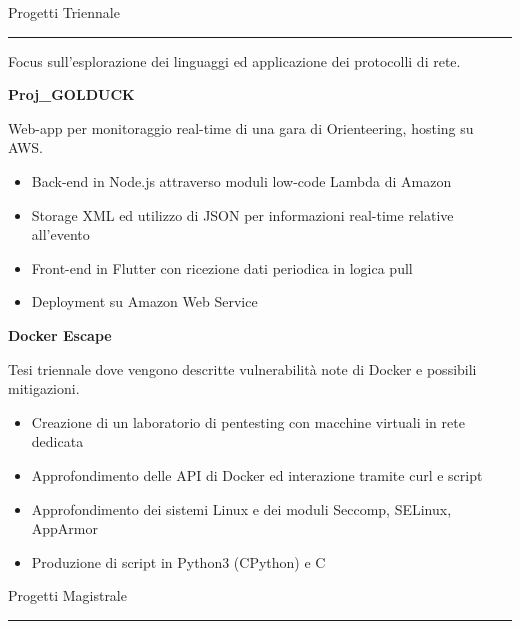 \documentclass[a4paper]{letter}
\begin{document}
\begin{minipage}[t]{0.30\textwidth}
\setlength{\baselineskip}{1.5\baselineskip}
\color{white}


\end{minipage}
\hfill
\begin{minipage}[t]{0.65\textwidth}
\setlength{\baselineskip}{1.4\baselineskip}

\vspace{2 mm}
{\large Progetti Triennale}
\rule{\linewidth}{0.4pt}

Focus sull'esplorazione dei linguaggi ed applicazione dei protocolli di rete.

\vspace{2 mm}
{\large \textbf{Proj\_GOLDUCK}}

{\small Web-app per monitoraggio real-time di una gara di Orienteering, hosting su AWS. }

\begin{itemize}
    \item Back-end in Node.js attraverso moduli low-code Lambda di Amazon
    \item Storage XML ed utilizzo di JSON per informazioni real-time relative all'evento
    \item Front-end in Flutter con ricezione dati periodica in logica pull
    \item Deployment su Amazon Web Service
\end{itemize}
\vspace{1 mm}

{\large \textbf{Docker Escape}}

{\small Tesi triennale dove vengono descritte vulnerabilità note di Docker e possibili mitigazioni. }

\begin{itemize}
    \item Creazione di un laboratorio di pentesting con macchine virtuali in rete dedicata
    \item Approfondimento delle API di Docker ed interazione tramite curl e script
    \item Approfondimento dei sistemi Linux e dei moduli Seccomp, SELinux, AppArmor
    \item Produzione di script in Python3 (CPython) e C
\end{itemize}
\vspace{1 mm}

\vspace{1 mm}
{\large Progetti Magistrale}
\rule{\linewidth}{0.4pt}


\end{minipage}
\end{document}
